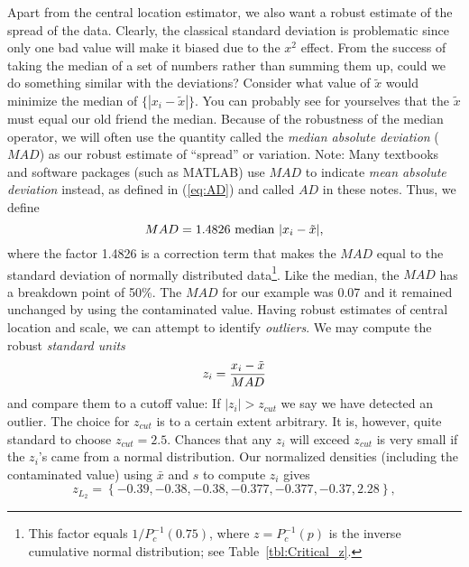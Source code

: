 	Apart from the central location estimator, we also want a robust estimate of the spread of the 
data.  Clearly, the classical standard deviation is problematic since only one bad value will make it 
biased due to the $x^2$  effect.  From the success of taking the median of a set of numbers rather 
than summing them up, could we do something similar with the deviations?  Consider what 
value of $\tilde{x}$ would minimize the median of $\{|x_i - \tilde{x}|\}$.
You can probably see for yourselves that the $\tilde{x}$ must equal 
our old friend the median.  Because of the robustness of the median operator, we will often use 
the quantity called the \emph{median absolute deviation} ($MAD$) as our robust estimate of ``spread'' or variation.
Note: Many textbooks and software packages (such as MATLAB) use $MAD$ to indicate \emph{mean absolute deviation}
instead, as defined in (\ref{eq:AD}) and called $AD$ in these notes.  Thus, we define
\begin{equation}
	\index{MAD}
	\index{Median absolute deviation}
MAD = 1.4826 \mbox{ median } |x_i - \tilde{x} |,
\end{equation}
where the factor 1.4826 is a correction term that makes the $MAD$ equal to the standard deviation 
of normally distributed data\footnote{This factor equals $1/P^{-1}_c(0.75)$, where $z = P^{-1}_c(p)$ is
the inverse cumulative normal distribution; see Table~\ref{tbl:Critical_z}.}.  Like the median, the $MAD$ has a breakdown point of 50\%.  The $MAD$ 
for our  example was 0.07 and it remained unchanged by using the contaminated value.
	Having robust estimates of central location and scale, we can attempt to identify \emph{outliers}.  We may 
compute the robust \emph{standard units}
\begin{equation}
	\index{Normal scores!robust}
	\index{Standard scores!robust}
z_i = \frac{x_i - \tilde{x}} {MAD}
\end{equation}
and compare them to a cutoff value: If $|z_i| > z_{cut}$ we say we have detected an outlier.  The choice 
for $z_{cut}$ is to a certain extent arbitrary.  It is, however, quite standard to choose $z_{cut} = 2.5$.  Chances 
that any $z_i$ will exceed $z_{cut}$  is very small if the $z_i$'s came from a normal distribution.  Our 
normalized densities (including the contaminated value) using $\bar{x}$ and $s$ to compute $z_i$ gives 
\begin{equation}
z_{\scriptscriptstyle L_{\scriptscriptstyle 2}} = \left \{ -0.39, -0.38, -0.38, -0.377, -0.377, -0.37, 2.28\right \},
\end{equation}
